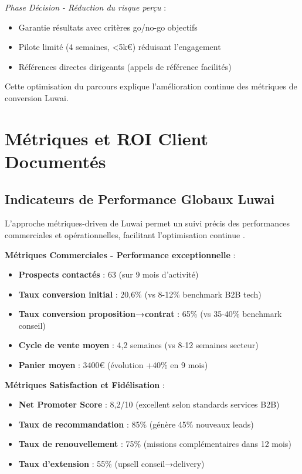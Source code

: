 \emph{Phase Décision - Réduction du risque perçu} :
\begin{itemize}
    \item Garantie résultats avec critères go/no-go objectifs
    \item Pilote limité (4 semaines, <5k€) réduisant l'engagement
    \item Références directes dirigeants (appels de référence facilités)
\end{itemize}

Cette optimisation du parcours explique l'amélioration continue des métriques de conversion Luwai.

\section{Métriques et ROI Client Documentés}

\subsection{Indicateurs de Performance Globaux Luwai}

L'approche métriques-driven de Luwai permet un suivi précis des performances commerciales et opérationnelles, facilitant l'optimisation continue \cite{luwai2025kpis}.

\textbf{Métriques Commerciales - Performance exceptionnelle} :
\begin{itemize}
    \item \textbf{Prospects contactés} : 63 (sur 9 mois d'activité)
    \item \textbf{Taux conversion initial} : 20,6\% (vs 8-12\% benchmark B2B tech)
    \item \textbf{Taux conversion proposition→contrat} : 65\% (vs 35-40\% benchmark conseil)
    \item \textbf{Cycle de vente moyen} : 4,2 semaines (vs 8-12 semaines secteur)
    \item \textbf{Panier moyen} : 3400€ (évolution +40\% en 9 mois)
\end{itemize}

\textbf{Métriques Satisfaction et Fidélisation} :
\begin{itemize}
    \item \textbf{Net Promoter Score} : 8,2/10 (excellent selon standards services B2B)
    \item \textbf{Taux de recommandation} : 85\% (génère 45\% nouveaux leads)
    \item \textbf{Taux de renouvellement} : 75\% (missions complémentaires dans 12 mois)
    \item \textbf{Taux d'extension} : 55\% (upsell conseil→delivery)
\end{itemize}

